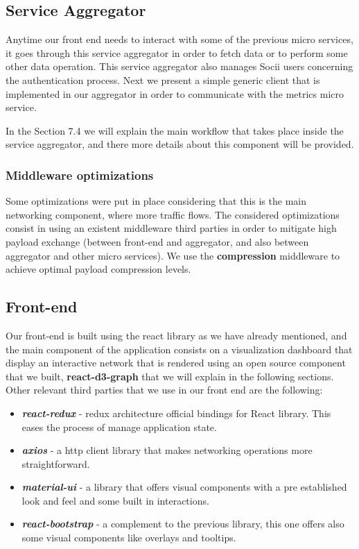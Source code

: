 

\subsection{Service Aggregator}
Anytime our front end needs to interact with some of the previous micro services, it goes through this service aggregator
in order to fetch data or to perform some other data operation. This service aggregator also manages Socii users concerning the authentication process.
Next we present a simple generic client that is implemented in our aggregator in order to communicate with the metrics micro service.



In the Section 7.4 we will explain the main workflow that takes place inside the service aggregator, and there more details about this component will be provided.

\subsubsection{Middleware optimizations}
Some optimizations were put in place considering that this is the main networking component, where more traffic flows. The considered optimizations consist in using an existent middleware third parties in order to mitigate high payload exchange (between front-end and aggregator, and also between aggregator and other micro services). We use the \textbf{compression} \citep{compression} middleware to achieve optimal payload compression levels.

\subsection{Front-end}

Our front-end is built using the react library as we have already mentioned, and the main component of the application consists on a visualization dashboard that display an interactive network that is rendered using an open source component that we built, \textbf{react-d3-graph} \citep{reactd3graph} that we will explain in the following sections. Other relevant third parties that we use in our front end are the following:

\begin{itemize}
    \item \textit{\textbf{react-redux}} \citep{reactredux} - redux architecture official bindings for React library. This eases the process of manage application state.
    \item \textit{\textbf{axios}} \citep{axios} - a http client library that makes networking operations more straightforward.
    \item \textit{\textbf{material-ui}} \citep{materialui} - a library that offers visual components with a pre established look and feel and some built in interactions.
    \item \textit{\textbf{react-bootstrap}} \citep{reactbootstrap} - a complement to the previous library, this one offers also some visual components like overlays and tooltips.
\end{itemize}

